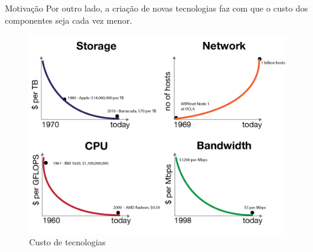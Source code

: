 \documentclass[aspectratio=169]{beamer}
\newcommand*\setcaptioncitation[1]{\def\captioncitation{\textit{Source:}~#1}}
\let\captioncitation\relax
\begin{document}
            
        \begin{frame} {Motivação}
            \centering  
            \Large
            Por outro lado, a criação de novas tecnologias faz com que o custo dos componentes seja cada vez menor.
            \begin{figure}[ht]    
                            \includegraphics[scale=0.35]{custo.png}
                            \setcaptioncitation{  \href{http://radar.oreilly.com/2011/08/building-data-startups.html}{http://radar.oreilly.com/2011/08/building-data-startups.html }}
                            \caption{Custo de tecnologias}
                            \label{fig:custo}
                        \end{figure}
        \end{frame} 
            
\end{document}
